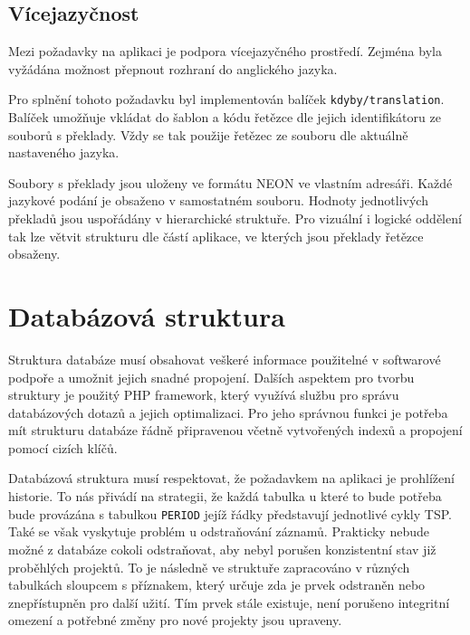 \documentclass[czech,BP]{thesiskiv}
\begin{document}
		\subsection{Vícejazyčnost}
		\par Mezi požadavky na aplikaci je podpora vícejazyčného prostředí. Zejména byla vyžádána možnost přepnout rozhraní do anglického jazyka.
		\par Pro splnění tohoto požadavku byl implementován balíček \texttt{kdyby/translation}. Balíček umožňuje vkládat do šablon a kódu řetězce dle jejich identifikátoru ze souborů s překlady. Vždy se tak použije řetězec ze souboru dle aktuálně nastaveného jazyka.
		\par Soubory s překlady jsou uloženy ve formátu NEON ve vlastním adresáři. Každé jazykové podání je obsaženo v samostatném souboru. Hodnoty jednotlivých překladů jsou uspořádány v hierarchické struktuře. Pro vizuální i logické oddělení tak lze větvit strukturu dle částí aplikace, ve kterých jsou překlady řetězce obsaženy.
	
	\section{Databázová struktura}
		\par Struktura databáze musí obsahovat veškeré informace použitelné v softwarové podpoře a umožnit jejich snadné propojení. Dalších aspektem pro tvorbu struktury je použitý PHP framework, který využívá službu pro správu databázových dotazů a jejich optimalizaci. Pro jeho správnou funkci je potřeba mít strukturu databáze řádně připravenou včetně vytvořených indexů a propojení pomocí cizích klíčů.
		\par Databázová struktura musí respektovat, že požadavkem na aplikaci je prohlížení historie. To nás přivádí na strategii, že každá tabulka u které to bude potřeba bude provázána s tabulkou \texttt{PERIOD} jejíž řádky představují jednotlivé cykly TSP. Také se však vyskytuje problém u odstraňování záznamů. Prakticky nebude možné z databáze cokoli odstraňovat, aby nebyl porušen konzistentní stav již proběhlých projektů. To je následně ve struktuře zapracováno v různých tabulkách sloupcem s příznakem, který určuje zda je prvek odstraněn nebo znepřístupněn pro další užití. Tím prvek stále existuje, není porušeno integritní omezení a potřebné změny pro nové projekty jsou upraveny.
		
\end{document}
